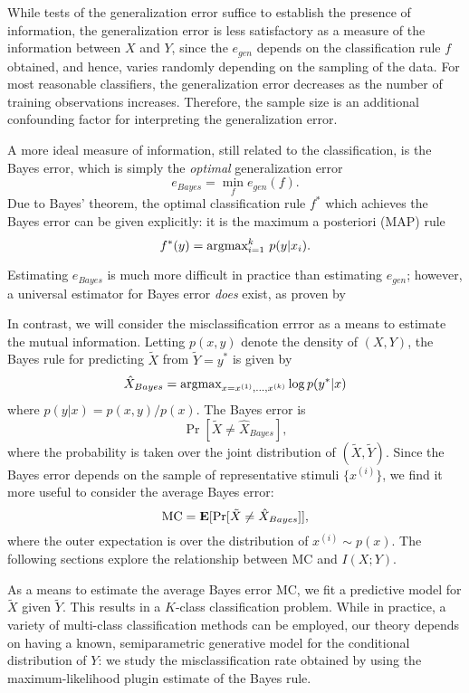 \documentclass[12pt]{article}
\begin{document}
While tests of the generalization error suffice to establish the presence of information,
the generalization error is less satisfactory as a measure of the information between $X$ and $Y$,
since the $e_{gen}$ depends on the classification rule $f$ obtained, and hence, varies randomly depending on the sampling of the data.
For most reasonable classifiers, the generalization error decreases as the number of training observations increases.
Therefore, the sample size is an additional confounding factor for interpreting the generalization error.

A more ideal measure of information, still related to the classification, is the Bayes error, which is simply the \emph{optimal} generalization error
\[
e_{Bayes} = \min_f e_{gen}(f).
\]
Due to Bayes' theorem, the optimal classification rule $f^*$ which achieves the Bayes error can be given explicitly:
it is the maximum a posteriori (MAP) rule
\[
f^*(y) = \text{argmax}_{i=1}^k\ p(y|x_i).
\]

Estimating $e_{Bayes}$ is much more difficult in practice than estimating $e_{gen}$; however,
a universal estimator for Bayes error \emph{does} exist, as proven by 


In contrast, we will consider the misclassification errror as a means to
estimate the mutual information.  Letting $p(x,y)$ denote the density of $(X,Y)$,
the Bayes rule for predicting $\tilde{X}$ from $\tilde{Y} = y^*$ is given by
\[
\hat{X}_{Bayes} = \text{argmax}_{x = x^{(1)}, \hdots, x^{(k)}} \log p(y^*|x)
\]
where $p(y|x) = p(x,y)/p(x)$.  The Bayes error is
\[
\Pr[\tilde{X} \neq \hat{X}_{Bayes}],
\]
where the probability is taken over the joint distribution of
$(\tilde{X}, \tilde{Y})$.  Since the Bayes error depends on the
sample of representative stimuli $\{x^{(i)}\}$,
we find it more useful to consider the average Bayes error:
\[
\text{MC} = \textbf{E}[\Pr[\tilde{X} \neq \hat{X}_{Bayes}]],
\]
where the outer expectation is over the distribution of $x^{(i)} \sim p(x)$.
The following sections explore the relationship between $\text{MC}$
and $I(X;Y)$.

As a means to estimate the average Bayes error $\text{MC}$, we fit a
predictive model for $\tilde{X}$ given $\tilde{Y}$.  This results in a
$K$-class classification problem.  While in practice, a variety of
multi-class classification methods can be employed, our theory depends
on having a known, semiparametric generative model for the conditional
distribution of $Y$: we study the misclassification rate obtained by
using the maximum-likelihood plugin estimate of the Bayes rule.
\end{document}
